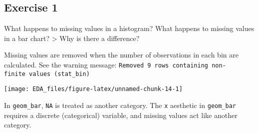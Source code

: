 \documentclass[]{book}
\newenvironment{Shaded}{\begin{snugshade}}{\end{snugshade}}
\newcommand{\CommentTok}[1]{\textcolor[rgb]{0.56,0.35,0.01}{\textit{#1}}}
\newcommand{\DataTypeTok}[1]{\textcolor[rgb]{0.13,0.29,0.53}{#1}}
\newcommand{\DecValTok}[1]{\textcolor[rgb]{0.00,0.00,0.81}{#1}}
\newcommand{\FloatTok}[1]{\textcolor[rgb]{0.00,0.00,0.81}{#1}}
\newcommand{\KeywordTok}[1]{\textcolor[rgb]{0.13,0.29,0.53}{\textbf{#1}}}
\newcommand{\NormalTok}[1]{#1}
\newcommand{\OperatorTok}[1]{\textcolor[rgb]{0.81,0.36,0.00}{\textbf{#1}}}
\newcommand{\OtherTok}[1]{\textcolor[rgb]{0.56,0.35,0.01}{#1}}
\newcommand{\StringTok}[1]{\textcolor[rgb]{0.31,0.60,0.02}{#1}}
\theoremstyle{plain}
\theoremstyle{remark}
\theoremstyle{definition}
\theoremstyle{definition}
\theoremstyle{definition}
\theoremstyle{remark}
\begin{document}
\hypertarget{exercise-1-14}{%
\subsection{Exercise 1}\label{exercise-1-14}}

What happens to missing values in a histogram? What happens to missing
values in a bar chart? \textgreater{} Why is there a difference?

Missing values are removed when the number of observations in each bin
are calculated. See the warning message:
\texttt{Removed\ 9\ rows\ containing\ non-finite\ values\ (stat\_bin)}

\begin{Shaded}
\end{Shaded}

\begin{center}\texttt{[image: EDA\_files/figure-latex/unnamed-chunk-14-1]} \end{center}

In \texttt{geom\_bar}, \texttt{NA} is treated as another category. The
\texttt{x} aesthetic in \texttt{geom\_bar} requires a discrete
(categorical) variable, and missing values act like another category.

\begin{Shaded}
\end{Shaded}
\end{document}
